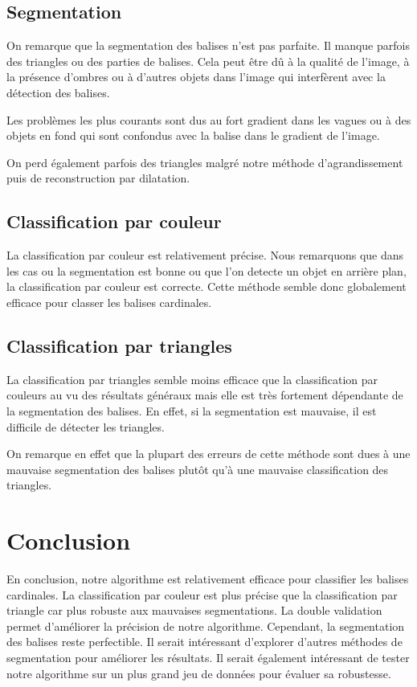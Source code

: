 \documentclass{article}
\begin{document}
\subsection{Segmentation}

On remarque que la segmentation des balises n'est pas parfaite. Il manque
parfois des triangles ou des parties de balises. Cela peut être dû à la qualité
de l'image, à la présence d'ombres ou à d'autres objets dans l'image qui
interfèrent avec la détection des balises.

Les problèmes les plus courants sont dus au fort gradient dans les vagues ou à
des objets en fond qui sont confondus avec la balise dans le gradient de
l'image.

On perd également parfois des triangles malgré notre méthode d'agrandissement
puis de reconstruction par dilatation.

\subsection{Classification par couleur}

La classification par couleur est relativement précise. Nous remarquons que
dans les cas ou la segmentation est bonne ou que l'on detecte un objet en
arrière plan, la classification par couleur est correcte. Cette méthode semble
donc globalement efficace pour classer les balises cardinales.

\subsection{Classification par triangles}

La classification par triangles semble moins efficace que la classification par
couleurs au vu des résultats généraux mais elle est très fortement dépendante
de la segmentation des balises. En effet, si la segmentation est mauvaise, il
est difficile de détecter les triangles.

On remarque en effet que la plupart des erreurs de cette méthode sont dues à
une mauvaise segmentation des balises plutôt qu'à une mauvaise classification
des triangles.

\section{Conclusion}

En conclusion, notre algorithme est relativement efficace pour classifier les
balises cardinales. La classification par couleur est plus précise que la
classification par triangle car plus robuste aux mauvaises segmentations. La
double validation permet d'améliorer la précision de notre algorithme.
Cependant, la segmentation des balises reste perfectible. Il serait intéressant
d'explorer d'autres méthodes de segmentation pour améliorer les résultats. Il
serait également intéressant de tester notre algorithme sur un plus grand jeu
de données pour évaluer sa robustesse.
\end{document}
